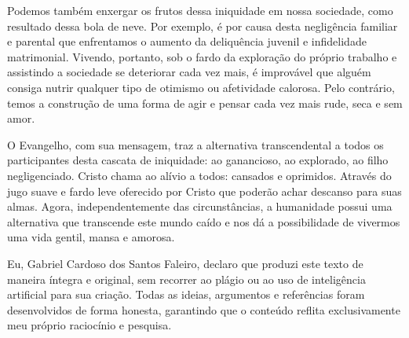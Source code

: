 \documentclass[
    article,            %
	12pt,				%
	oneside,			%
	a4paper,			%
	chapter=TITLE,		%
	section=TITLE,		%
	english,			%
	french,				%
	spanish,			%
	brazil				%
	]{abntex2}
\begin{document}
Podemos também enxergar os frutos dessa iniquidade em nossa sociedade, como resultado dessa bola de neve. Por exemplo, é por causa desta negligência familiar e parental que enfrentamos o aumento da deliquência juvenil e infidelidade matrimonial. Vivendo, portanto, sob o fardo da exploração do próprio trabalho e assistindo a sociedade se deteriorar cada vez mais, é improvável que alguém consiga nutrir qualquer tipo de otimismo ou afetividade calorosa. Pelo contrário, temos a construção de uma forma de agir e pensar cada vez mais rude, seca e sem amor.

O Evangelho, com sua mensagem, traz a alternativa transcendental a todos os participantes desta cascata de iniquidade: ao ganancioso, ao explorado, ao filho negligenciado. Cristo chama ao alívio a todos: cansados e oprimidos. Através do jugo suave e fardo leve oferecido por Cristo que poderão achar descanso para suas almas. Agora, independentemente das circunstâncias, a humanidade possui uma alternativa que transcende este mundo caído e nos dá a possibilidade de vivermos uma vida gentil, mansa e amorosa.


Eu, Gabriel Cardoso dos Santos Faleiro, declaro que produzi este texto de maneira íntegra e original, sem recorrer ao plágio ou ao uso de inteligência artificial para sua criação. Todas as ideias, argumentos e referências foram desenvolvidos de forma honesta, garantindo que o conteúdo reflita exclusivamente meu próprio raciocínio e pesquisa.

% 
\end{document}
